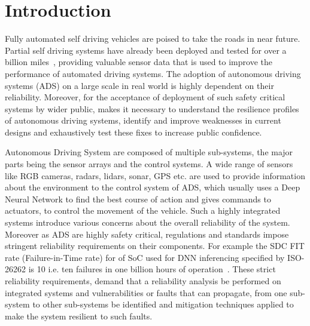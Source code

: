 \section{Introduction}

Fully automated self driving vehicles are poised to take the roads in near future. Partial self driving systems have already been deployed and tested for over a billion miles~\cite{teslasr},  providing valuable sensor data that is used to improve the performance of automated driving systems. The adoption of autonomous driving systems (ADS) on a large scale in real world is highly dependent on their reliability. Moreover, for the acceptance of deployment of such safety critical systems by wider public, makes it necessary to understand the resilience profiles of autonomous driving systems, identify and improve weaknesses in current designs and exhaustively test these fixes to increase public confidence.

 
Autonomous Driving System are composed of multiple sub-systems, the major parts being the sensor arrays and the control systems. A wide range of sensors like RGB cameras, radars, lidars, sonar, GPS etc. are used to provide information about the environment to the control system of ADS, which usually uses a Deep Neural Network to find the best course of action and gives commands to actuators, to control the movement of the vehicle. Such a highly integrated systems introduce various concerns about the overall reliability of the system. Moreover as ADS are highly safety critical, regulations and standards impose stringent reliability requirements on their components. For example the SDC FIT rate (Failure-in-Time rate) for of SoC used for DNN inferencing specified by ISO-26262 is 10 i.e. ten failures in one billion hours of operation~\cite{guanpeng17sc}. These strict reliability requirements, demand that a reliability analysis be performed on integrated systems and vulnerabilities or faults that can propagate, from one sub-system to other sub-systems be identified and mitigation techniques applied to make the system resilient to such faults.

